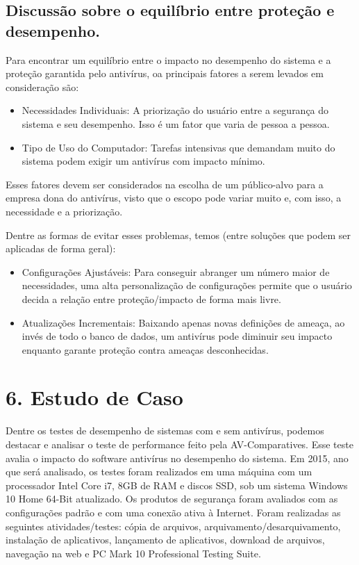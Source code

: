\documentclass[10pt,conference,twocolumn]{article}
\begin{document}
\subsection*{Discussão sobre o equilíbrio entre proteção e desempenho.}
Para encontrar um equilíbrio entre o impacto no desempenho do sistema e a proteção garantida pelo antivírus, oa principais fatores a serem levados em consideração são:
\begin{itemize}
\item
Necessidades Individuais:
A priorização do usuário entre a segurança do sistema e seu desempenho. Isso é um fator que varia de pessoa a pessoa.
\item
Tipo de Uso do Computador: 
Tarefas intensivas que demandam muito do sistema podem exigir um antivírus com impacto mínimo.
\end{itemize}

Esses fatores devem ser considerados na escolha de um público-alvo para a empresa dona do antivírus, visto que o escopo pode variar muito e, com isso, a necessidade e a priorização.\newline

Dentre as formas de evitar esses problemas, temos (entre soluções que podem ser aplicadas de forma geral):
\begin{itemize}
\item
Configurações Ajustáveis: 
Para conseguir abranger um número maior de necessidades, uma alta personalização de configurações permite que o usuário decida a relação entre proteção/impacto de forma mais livre.
\item
Atualizações Incrementais: 
Baixando apenas novas definições de ameaça, ao invés de todo o banco de dados, um antivírus pode diminuir seu impacto enquanto garante proteção contra ameaças desconhecidas.
\end{itemize}

\section*{6. Estudo de Caso}
Dentre os testes de desempenho de sistemas com e sem antivírus, podemos destacar e analisar o teste de performance feito pela AV-Comparatives. Esse teste avalia o impacto do software antivírus no desempenho do sistema.
Em 2015, ano que será analisado, os testes foram realizados em uma máquina com um processador Intel Core i7, 8GB de RAM e discos SSD, sob um sistema Windows 10 Home 64-Bit atualizado. Os produtos de segurança foram avaliados com as configurações padrão e com uma conexão ativa à Internet. Foram realizadas as seguintes atividades/testes: cópia de arquivos, arquivamento/desarquivamento, instalação de aplicativos, lançamento de aplicativos, download de arquivos, navegação na web e PC Mark 10 Professional Testing Suite.
\end{document}
